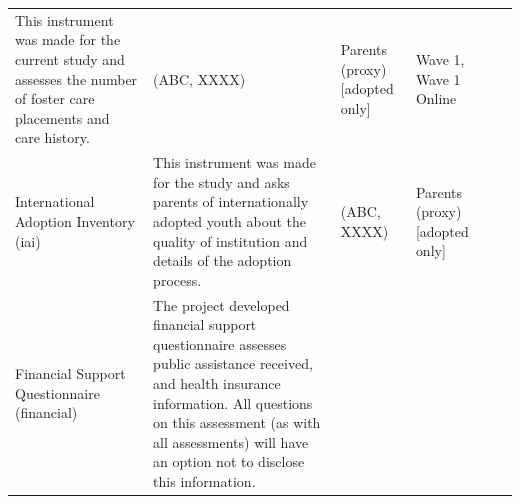 \documentclass[]{book}
\begin{document}
\begin{longtable}[]{@{}llllll@{}}
\begin{minipage}[t]{0.18\columnwidth}
This instrument was made for the current study and assesses the number of foster care placements and care history.\strut
\end{minipage} & \begin{minipage}[t]{0.15\columnwidth}\raggedright
(ABC, XXXX)\strut
\end{minipage} & \begin{minipage}[t]{0.16\columnwidth}\raggedright
Parents (proxy){[}adopted only{]}\strut
\end{minipage} & \begin{minipage}[t]{0.06\columnwidth}\raggedright
Wave 1, Wave 1 Online\strut
\end{minipage} & \begin{minipage}[t]{0.10\columnwidth}\raggedright
\strut
\end{minipage}\tabularnewline
\begin{minipage}[t]{0.18\columnwidth}\raggedright
International Adoption Inventory (iai)\strut
\end{minipage} & \begin{minipage}[t]{0.18\columnwidth}\raggedright
This instrument was made for the study and asks parents of internationally adopted youth about the quality of institution and details of the adoption process.\strut
\end{minipage} & \begin{minipage}[t]{0.15\columnwidth}\raggedright
(ABC, XXXX)\strut
\end{minipage} & \begin{minipage}[t]{0.16\columnwidth}\raggedright
Parents (proxy){[}adopted only{]}\strut
\end{minipage} & \begin{minipage}[t]{0.06\columnwidth}\raggedright
\strut
\end{minipage} & \begin{minipage}[t]{0.10\columnwidth}\raggedright
\strut
\end{minipage}\tabularnewline
\begin{minipage}[t]{0.18\columnwidth}\raggedright
Financial Support Questionnaire (financial)\strut
\end{minipage} & \begin{minipage}[t]{0.18\columnwidth}\raggedright
The project developed financial support questionnaire assesses public assistance received, and health insurance information. All questions on this assessment (as with all assessments) will have an option not to disclose this information.\strut
\end{minipage} & \begin{minipage}[t]{0.15\columnwidth}\raggedright

\end{minipage}
\end{longtable}
\end{document}

